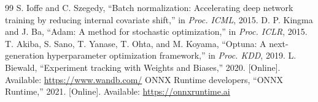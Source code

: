 \documentclass[conference]{IEEEtran}
\begin{document}
\begin{thebibliography}{99}
 S. Ioffe and C. Szegedy, ``Batch normalization: Accelerating deep network training by reducing internal covariate shift,'' in \emph{Proc. ICML}, 2015.
 D. P. Kingma and J. Ba, ``Adam: A method for stochastic optimization,'' in \emph{Proc. ICLR}, 2015.
 T. Akiba, S. Sano, T. Yanase, T. Ohta, and M. Koyama, ``Optuna: A next-generation hyperparameter optimization framework,'' in \emph{Proc. KDD}, 2019.
 L. Biewald, ``Experiment tracking with Weights and Biases,'' 2020. [Online]. Available: \url{https://www.wandb.com/}
 ONNX Runtime developers, ``ONNX Runtime,'' 2021. [Online]. Available: \url{https://onnxruntime.ai}
\end{thebibliography}
\end{document}

